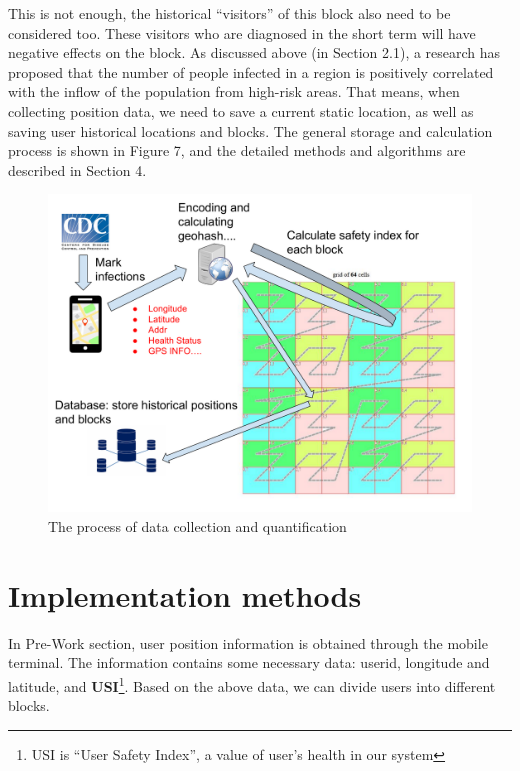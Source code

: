 \documentclass[sigplan,screen]{acmart}
\begin{document}
This is not enough, the historical ``visitors'' of this block also need to be considered too.
These visitors who are diagnosed in the short term will have negative effects on the block.
As discussed above (in Section 2.1), a research has proposed that the number of people infected in a region is positively correlated with the inflow of the population from high-risk areas.
That means, when collecting position data, we need to save a current static location, as well as saving user historical locations and blocks.
The general storage and calculation process is shown in Figure 7, and the detailed methods and algorithms are described in Section 4.
\begin{figure}[htb]
	\centering\includegraphics[width=\linewidth]{process.pdf}
	\caption{The process of data collection and quantification}
\end{figure}
\section{Implementation methods}
In Pre-Work section, user position information is obtained through the mobile terminal.
The information contains some necessary data: userid, longitude and latitude, and \textbf{USI}\footnote{USI is ``User Safety Index'', a value of user's health in our system}.
Based on the above data, we can divide users into different blocks.
\end{document}
